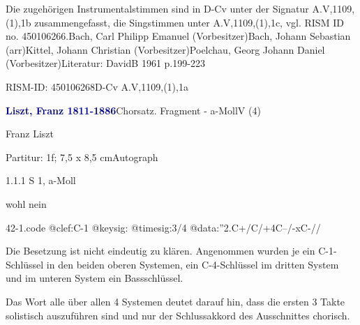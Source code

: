 \documentclass[a4paper, twocolumn, 11pt]{book}
\begin{document}
\newline %
\par Die zugehörigen Instrumentalstimmen sind in D-Cv unter der Signatur A.V,1109,(1),1b zusammengefasst, die Singstimmen unter A.V,1109,(1),1c, vgl. RISM ID no. 450106266.\newline Bach, Carl Philipp Emanuel  (Vorbesitzer)\newline Bach, Johann Sebastian  (arr)\newline Kittel, Johann Christian  (Vorbesitzer)\newline Poelchau, Georg Johann Daniel  (Vorbesitzer)\newline Literatur: DavidB 1961  p.199-223
\par RISM-ID: 450106268\newline D-Cv  A.V,1109,(1),1a
\par \vspace{16pt} \textcolor{darkblue}{\textbf{Liszt, Franz  1811-1886}}\hfillplus{[42]}\newline Chorsatz. Fragment - a-Moll\newline V (4)
\par \begin{itshape} Franz Liszt\end{itshape} 
\par \textcolor{darkblue}{}  Partitur: 1f; 7,5 x 8,5 cm\newline Autograph
\par 1.1.1  S 1, a-Moll\newline \begin{footnotesize} [...] wohl nein \end{footnotesize}  
\begin{filecontents*}{42-1.code}
@clef:C-1
@keysig:
@timesig:3/4
@data:''2.C+/C/+4C--/-xC-//
\end{filecontents*}
\newline %
\par Die Besetzung ist nicht eindeutig zu klären. Angenommen wurden je ein C-1-Schlüssel in den beiden oberen Systemen, ein C-4-Schlüssel im dritten System und im unteren System ein Bassschlüssel.
\par Das Wort {\textquotedbl}alle{\textquotedbl} über allen 4 Systemen deutet darauf hin, dass die ersten 3 Takte solistisch auszuführen sind und nur der Schlussakkord des Ausschnittes chorisch.
\end{document}
